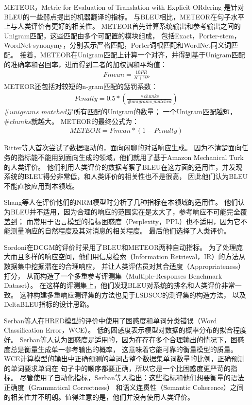 METEOR，Metric for Evaluation of Translation with Explicit ORdering
是针对BLEU的一些弱点提出的机器翻译的指标。
与BLEU相比，METEOR在句子水平上与人类评价有更好的相关性。
METEOR首先计算系统输出和参考输出之间的Unigram匹配，这些匹配由多个可配置的模块组成，
包括Exact，Porter-stem，WordNet-synonymy，分别表示严格匹配，Porter词根匹配和WordNet同义词匹配。
接着，METEOR在Unigram匹配上计算一个对齐，并得到基于Unigram匹配的准确率和召回率，进而得到二者的加权调和平均值：
\begin{align}
    \textit{Fmean} = \frac{10PR}{R + 9P}
\end{align}
METEOR还包括对较短的n-gram匹配的惩罚系数：
\begin{align}
    \textit{Penalty} = 0.5 * \left( \frac{\#chunks}{\#unigrams\_matched} \right)
\end{align}
$\#unigrams\_matched$是所有匹配的Unigram的数量；
一个Unigram匹配越短，$\#chunks$就越大。
METEOR的最终公式为：
\begin{align}
    \textit{METEOR} = \textit{Fmean} * (1 - \textit{Penalty})
\end{align}


Ritter等人首次尝试了数据驱动的，面向闲聊的对话响应生成。
因为不清楚面向任务的指标能不能用到面向生成的领域，他们就用了基于Amazon Mechanical Turk的人类评价。
他们利用人类评价的数据考察了BLEU在这方面的适用性，并发现系统的BLEU得分非常低，和人类评价的相关性也不是很高，
因此他们认为BLEU不能直接应用到本领域。

Shang等人在评价他们的NRM模型时分析了几种指标在本领域的适用性。
他们认为BLEU并不适用，因为合理的响应的范围实在是太大了，参考响应不可能完全覆盖到；
而常用于语言模型的指标困惑度（Perplexity，PPL）也不适用，因为它不能测量响应的自然程度及其对消息的相关程度。
最后他们选择了人类评价。

Sordoni在DCGM的评价时采用了BLEU和METEOR两种自动指标。
为了处理庞大而且多样的响应空间，他们用信息检索（Information Retrieval，IR）的方法从数据集中挖掘潜在的合理响应，
并让人类评估员对其合适度（Appropriateness）打分，
从而构造了一个多重参考评测集（Multiple-Responses Benchmark Dataset）。
在这样的评测集上，他们发现BLEU对系统的排名和人类评价非常一致。
这种构建多重响应测评集的方法也见于LSDSCC的测评集的构造方法，
以及DeltaBLEU指标的设计思路。

Serban等人在HRED模型的评价中使用了困惑度和单词分类错误（Word Classification Error，WCE）。
低的困惑度表示模型对数据的概率分布的拟合程度好。
Serban等人认为困惑度是适用的，因为在存在多个合理输出的情况下，困惑度总是衡量生成单一参考输出的概率，
这意味着它能可靠的衡量模型的质量。
WCE计算模型的输出中正确预测的单词占整个数据集单词数量的比例，正确预测的单词要求单词在
句子中的顺序都要正确，所以它是一个比困惑度更严苛的指标。
尽管使用了自动化指标，Serban等人指出：这些指标和他们想要衡量的语法正确度（Grammatical Correctness）
和语义连贯性（Semantic Coherence）之间的相关性并不明朗。值得注意的是，他们并没有使用人类评价。

